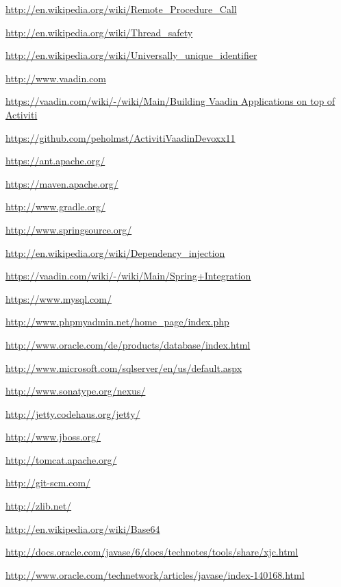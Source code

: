 \documentclass[paper=a4,twoside=false,BCOR=0mm,DIV=calc,fontsize=12pt]{scrartcl}
\begin{document}
\begin{thebibliography}{99}
 \url{http://en.wikipedia.org/wiki/Remote_Procedure_Call}

 \url{http://en.wikipedia.org/wiki/Thread_safety}

 \url{http://en.wikipedia.org/wiki/Universally_unique_identifier}

 \url{http://www.vaadin.com}

 \url{https://vaadin.com/wiki/-/wiki/Main/Building Vaadin Applications on top of Activiti}

 \url{https://github.com/peholmst/ActivitiVaadinDevoxx11}

 \url{https://ant.apache.org/}

 \url{https://maven.apache.org/}

 \url{http://www.gradle.org/}

 \url{http://www.springsource.org/}

 \url{http://en.wikipedia.org/wiki/Dependency_injection}

 \url{https://vaadin.com/wiki/-/wiki/Main/Spring+Integration}

 \url{https://www.mysql.com/}

 \url{http://www.phpmyadmin.net/home_page/index.php}

 \url{http://www.oracle.com/de/products/database/index.html}

 \url{http://www.microsoft.com/sqlserver/en/us/default.aspx}

 \url{http://www.sonatype.org/nexus/}

 \url{http://jetty.codehaus.org/jetty/}

 \url{http://www.jboss.org/}

 \url{http://tomcat.apache.org/}

 \url{http://git-scm.com/}

 \url{http://zlib.net/}

 \url{http://en.wikipedia.org/wiki/Base64}

 \url{http://docs.oracle.com/javase/6/docs/technotes/tools/share/xjc.html}

 \url{http://www.oracle.com/technetwork/articles/javase/index-140168.html}

\end{thebibliography}
\end{document}
